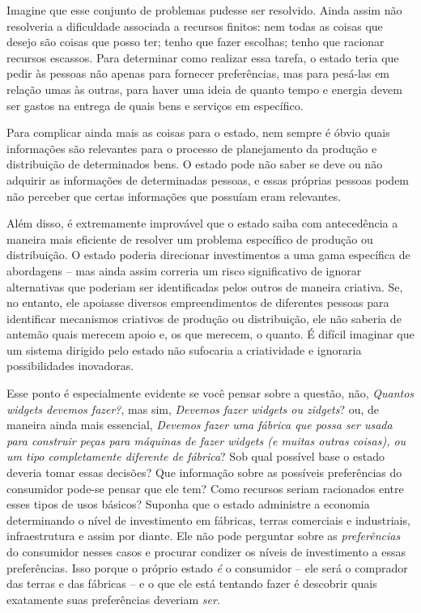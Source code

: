Imagine que esse conjunto de problemas pudesse ser resolvido. Ainda assim não resolveria a dificuldade associada a recursos finitos: nem todas as coisas que desejo são coisas que posso ter; tenho que fazer escolhas; tenho que racionar recursos escassos. Para determinar como realizar essa tarefa, o estado teria que pedir às pessoas não apenas para fornecer preferências, mas para pesá-las em relação umas às outras, para haver uma ideia de quanto tempo e energia devem ser gastos na entrega de quais bens e serviços em específico.

Para complicar ainda mais as coisas para o estado, nem sempre é óbvio quais informações são relevantes para o processo de planejamento da produção e distribuição de determinados bens. O estado pode não saber se deve ou não adquirir as informações de determinadas pessoas, e essas próprias pessoas podem não perceber que certas informações que possuíam eram relevantes.

Além disso, é extremamente improvável que o estado saiba com antecedência a maneira mais eficiente de resolver um problema específico de produção ou distribuição. O estado poderia direcionar investimentos a uma gama específica de abordagens -- mas ainda assim correria um risco significativo de ignorar alternativas que poderiam ser identificadas pelos outros de maneira criativa. Se, no entanto, ele apoiasse diversos empreendimentos de diferentes pessoas para identificar mecanismos criativos de produção ou distribuição, ele não saberia de antemão quais merecem apoio e, os que merecem, o quanto. É difícil imaginar que um sistema dirigido pelo estado não sufocaria a criatividade e ignoraria possibilidades inovadoras. 

Esse ponto é especialmente evidente se você pensar sobre a questão, não, \emph{Quantos widgets devemos fazer?}, mas sim, \emph{Devemos fazer widgets ou zidgets}? ou, de maneira ainda mais essencial, \emph{Devemos fazer uma fábrica que possa ser usada para construir peças para máquinas de fazer widgets (e muitas outras coisas), ou um tipo completamente diferente de fábrica}? Sob qual possível base o estado deveria tomar essas decisões? Que informação sobre as possíveis preferências do consumidor pode-se pensar que ele tem? Como recursos seriam racionados entre esses tipos de usos básicos? Suponha que o estado administre a economia determinando o nível de investimento em fábricas, terras comerciais e industriais, infraestrutura e assim por diante. Ele não pode perguntar sobre as \emph{preferências} do consumidor nesses casos e procurar condizer os níveis de investimento a essas preferências. Isso porque o próprio estado \emph{é} o consumidor -- ele será o comprador das terras e das fábricas -- e o que ele está tentando fazer é descobrir quais exatamente suas preferências deveriam \emph{ser}.

